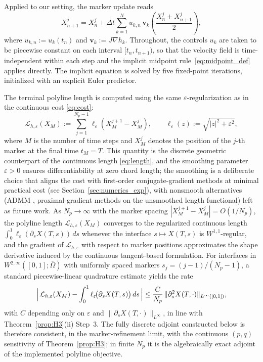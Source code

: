 \documentclass[12pt, reqno]{amsart}
\theoremstyle{plain}
\theoremstyle{definition}
\numberwithin{equation}{section}
\numberwithin{figure}{section}
\numberwithin{algorithm}{section}
\begin{document}
Applied to our setting, the marker update reads
\begin{equation}\label{eq:midpoint_marker}
X_{n+1}^j
=
X_n^j
+\Delta t\sum_{k=1}^N u_{k,n}\,
\mathbf v_k\!\left(\frac{X_n^j+X_{n+1}^j}{2}\right),
\end{equation}
where $u_{k,n}:=u_k(t_n)$ and $\mathbf v_k:=J\nabla h_k$. Throughout, the controls $u_k$ are taken to be piecewise constant on each interval $[t_n,t_{n+1})$, so that the velocity field is time-independent within each step and the implicit midpoint rule~\eqref{eq:midpoint_def} applies directly. The implicit equation is solved by five fixed-point iterations, initialized with an explicit Euler predictor.

The terminal polyline length is computed using the same $\varepsilon$-regularization as in the continuous cost \eqref{eq:cost}:
\begin{equation}\label{eq:polyline_length}
\mathcal L_{h,\varepsilon}(X_M)
:=
\sum_{j=1}^{N_p-1}\ell_\varepsilon(X_M^{j+1}-X_M^j),
\qquad
\ell_\varepsilon(z):=\sqrt{|z|^2+\varepsilon^2},
\end{equation}
where $M$ is the number of time steps and $X_M^j$ denotes the position of the $j$-th marker at the final time $t_M=T$. This quantity is the discrete geometric counterpart of the continuous length \eqref{eq:length}, and the smoothing parameter $\varepsilon>0$ ensures differentiability at zero chord length; the smoothing is a deliberate choice that aligns the cost with first-order conjugate-gradient methods at minimal practical cost (see Section~\ref{sec:numerics_exp}), with nonsmooth alternatives (ADMM \cite{Glowinski1992}, proximal-gradient methods on the unsmoothed length functional) left as future work. As $N_p\to\infty$ with the marker spacing $|X_M^{j+1}-X_M^j|=O(1/N_p)$, the polyline length $\mathcal L_{h,\varepsilon}(X_M)$ converges to the regularized continuous length $\int_0^1\ell_\varepsilon(\partial_sX(T,s))\,ds$ whenever the interface $s\mapsto X(T,s)$ is $W^{1,1}$-regular, and the gradient of $\mathcal L_{h,\varepsilon}$ with respect to marker positions approximates the shape derivative induced by the continuous tangent-based formulation. For interfaces in $W^{2,\infty}([0,1];\overline\Omega)$ with uniformly spaced markers $s_j=(j-1)/(N_p-1)$, a standard piecewise-linear quadrature estimate yields the rate
\begin{equation*}
\Bigl|\,\mathcal L_{h,\varepsilon}(X_M)-\int_0^1\ell_\varepsilon\!\bigl(\partial_sX(T,s)\bigr)\,ds\,\Bigr|
\le
\frac{C}{N_p}\,\|\partial_s^2X(T,\cdot)\|_{L^\infty([0,1])},
\end{equation*}
with $C$ depending only on $\varepsilon$ and $\|\partial_sX(T,\cdot)\|_{L^\infty}$, in line with Theorem~\ref{prop:H3}(ii) Step~3. The fully discrete adjoint constructed below is therefore consistent, in the marker-refinement limit, with the continuous $(p,q)$ sensitivity of Theorem~\ref{prop:H3}; in finite $N_p$ it is the algebraically exact adjoint of the implemented polyline objective.
\end{document}
